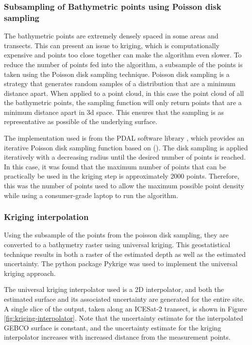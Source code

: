 \subsubsection{Subsampling of Bathymetric points using Poisson disk sampling}  \label{subsec:poissonsubsampling}
The bathymetric points are extremely densely spaced in some areas and transects. This can present an issue to kriging, which is computationally expensive and points too close together can make the algorithm even slower. To reduce the number of points fed into the algorithm, a subsample of the points is taken using the Poisson disk sampling technique. Poisson disk sampling is a strategy that generates random samples of a distribution that are a minimum distance apart. When applied to a point cloud, in this case the point cloud of all the bathymetric points, the sampling function will only return points that are a minimum distance apart in 3d space. This ensures that the sampling is as representative as possible of the underlying surface.

The implementation used is from the PDAL software library \parencite{howard_butler_2022_6369164}, which provides an iterative Poisson disk sampling function based on \citeauthor{McCool1992} (\citeyear{McCool1992}). The disk sampling is applied iteratively with a decreasing radius until the desired number of points is reached. In this case, it was found that the maximum number of points that can be practically be used in the kriging step is approximately 2000 points. Therefore, this was the number of points used to allow the maximum possible point density while using a consumer-grade laptop to run the algorithm. 

\subsubsection{Kriging interpolation}
Using the subsample of the points from the poisson disk sampling, they are converted to a bathymetry raster using universal kriging. This geostatistical technique results in both a raster of the estimated depth as well as the estimated uncertainty. The python package Pykrige \parencite{benjamin_murphy_2021_5380342} was used to implement the universal kriging approach. 

The universal kriging interpolator used is a 2D interpolator, and both the estimated surface and its associated uncertainty are generated for the entire site. A single slice of the output, taken along an ICESat-2 transect, is shown in Figure \ref{fig:kriging-interpolator}. Note that the uncertainty estimate for the interpolated GEBCO surface is constant, and the uncertainty estimate for the kriging interpolator increases with increased distance from the measurement points. 

